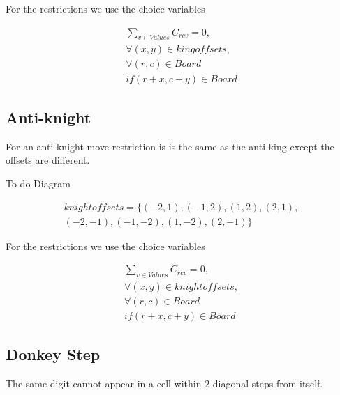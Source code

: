\documentclass{article}
\begin{document}
For the restrictions we use the choice variables

\begin{equation}
\begin{split}
\sum_{v \in Values}  C_{rcv} = 0, \\
\forall (x,y) \in kingoffsets, \\
\forall (r,c) \in Board \\
if (r+x, c+y) \in Board
\end{split}
\end{equation}


\subsection{Anti-knight}

For an anti knight move restriction is is the same as the anti-king except the offsets are different.

To do Diagram

\begin{equation}
\begin{split}
knightoffsets = \lbrace (-2,1), (-1,2), (1, 2), (2,1), \\
(-2,-1), (-1,-2), (1,- 2), (2,-1) \rbrace
\end{split}
\end{equation}

For the restrictions we use the choice variables

\begin{equation}
\begin{split}
\sum_{v \in Values}  C_{rcv} = 0, \\
\forall (x,y) \in knightoffsets,\\
\forall (r,c) \in Board \\
if (r+x, c+y) \in Board
\end{split}
\end{equation}


\subsection{Donkey Step}

The same digit cannot appear in a cell within 2 diagonal steps from itself.
\end{document}
